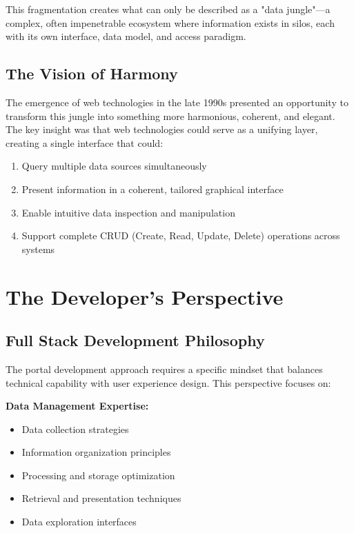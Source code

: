 This fragmentation creates what can only be described as a "data jungle"—a complex, often impenetrable ecosystem where information exists in silos, each with its own interface, data model, and access paradigm.

\subsection{The Vision of Harmony}

The emergence of web technologies in the late 1990s presented an opportunity to transform this jungle into something more harmonious, coherent, and elegant. The key insight was that web technologies could serve as a unifying layer, creating a single interface that could:

\begin{enumerate}
\item Query multiple data sources simultaneously
\item Present information in a coherent, tailored graphical interface
\item Enable intuitive data inspection and manipulation
\item Support complete CRUD (Create, Read, Update, Delete) operations across systems
\end{enumerate}

\section{The Developer's Perspective}

\subsection{Full Stack Development Philosophy}

The portal development approach requires a specific mindset that balances technical capability with user experience design. This perspective focuses on:

\textbf{Data Management Expertise:}
\begin{itemize}
\item Data collection strategies
\item Information organization principles
\item Processing and storage optimization
\item Retrieval and presentation techniques
\item Data exploration interfaces
\end{itemize}

